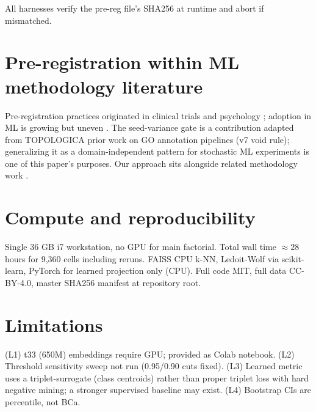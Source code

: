 \documentclass[11pt]{article}
\begin{document}
All harnesses verify the pre-reg file's SHA256 at runtime and abort if mismatched.

\section{Pre-registration within ML methodology literature}
Pre-registration practices \cite{nosek2018preregistration} originated in clinical trials and psychology \cite{forde2019scientific}; adoption in ML is growing but uneven \cite{guo2017calibration,ovadia2019shift}. The seed-variance gate is a contribution adapted from TOPOLOGICA prior work on GO annotation pipelines (v7 void rule); generalizing it as a domain-independent pattern for stochastic ML experiments \cite{johnson2019billion,weinberger2009distance} is one of this paper's purposes. Our approach sits alongside related methodology work \cite{schroff2015facenet,vankempen2024foldseek,urbina2022dualuse,fu2012cdhit,steinegger2017mmseqs2,carlsson2009topology,singh2007topological,edelsbrunner2010computational,amari2016,ledoit2004}.

\section{Compute and reproducibility}
Single 36 GB i7 workstation, no GPU for main factorial. Total wall time $\approx 28$ hours for 9{,}360 cells including reruns. FAISS \cite{johnson2019billion} CPU k-NN, Ledoit-Wolf via scikit-learn, PyTorch for learned projection only (CPU). Full code MIT, full data CC-BY-4.0, master SHA256 manifest at repository root.

\section{Limitations}
(L1) t33 (650M) embeddings require GPU; provided as Colab notebook.
(L2) Threshold sensitivity sweep not run (0.95/0.90 cuts fixed).
(L3) Learned metric uses a triplet-surrogate (class centroids) rather than proper triplet loss with hard negative mining; a stronger supervised baseline may exist.
(L4) Bootstrap CIs are percentile, not BCa.


\end{document}
